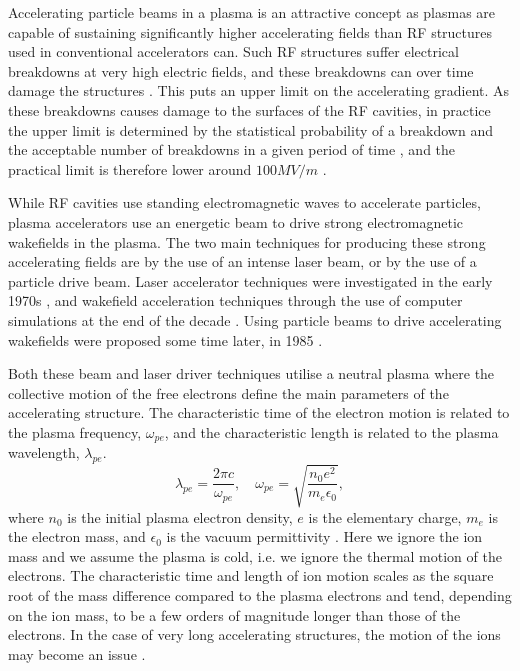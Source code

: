 Accelerating particle beams in a plasma is an attractive concept as plasmas are capable of sustaining significantly higher accelerating fields than RF structures used in conventional accelerators can. Such RF structures suffer electrical breakdowns at very high electric fields, and these breakdowns can over time damage the structures \cite{braun:2003}. This puts an upper limit on the accelerating gradient. As these breakdowns causes damage to the surfaces of the RF cavities, in practice the upper limit is determined by the statistical probability of a breakdown and the acceptable number of breakdowns in a given period of time \cite{pritzkau:2002}, and the practical limit is therefore lower \dash around $100\unit{MV/m}$ \cite{aicheler:2012}.

While RF cavities use standing electromagnetic waves to accelerate particles, plasma accelerators use an energetic beam to drive strong electromagnetic wakefields in the plasma. The two main techniques for producing these strong accelerating fields are by the use of an intense laser beam, or by the use of a particle drive beam. Laser accelerator techniques were investigated in the early 1970s \cite{chan:1971, palmer:1972}, and wakefield acceleration techniques through the use of computer simulations at the end of the decade \cite{tajima:1979}. Using particle beams to drive accelerating wakefields were proposed some time later, in 1985 \cite{chen:1985}.

Both these beam and laser driver techniques utilise a neutral plasma where the collective motion of the free electrons define the main parameters of the accelerating structure. The characteristic time of the electron motion is related to the plasma frequency, $\omega_{pe}$, and the characteristic length is related to the plasma wavelength, $\lambda_{pe}$.
\begin{equation}
    \lambda_{pe} = \frac{2\pi c}{\omega_{pe}}, \quad
    \omega_{pe}  = \sqrt{\frac{n_{0}e^{2}}{m_{e}\epsilon_{0}}}, \label{EQ:PWFA:L0W0}
\end{equation}
where $n_{0}$ is the initial plasma electron density, $e$ is the elementary charge, $m_{e}$ is the electron mass, and $\epsilon_{0}$ is the vacuum permittivity \cite{tonks:1929, esarey:1996, pecseli:2012}. Here we ignore the ion mass and we assume the plasma is cold, i.e. we ignore the thermal motion of the electrons. The characteristic time and length of ion motion scales as the square root of the mass difference compared to the plasma electrons and tend, depending on the ion mass, to be a few orders of magnitude longer than those of the electrons. In the case of very long accelerating structures, the motion of the ions may become an issue \cite{rosenzweig:2005}.

